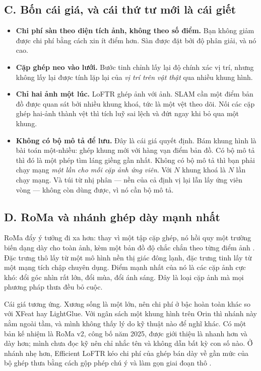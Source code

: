 \documentclass[../../deep_learning.tex]{subfiles}
\begin{document}
\subsection{C. Bốn cái giá, và cái thứ tư mới là cái giết}
\begin{itemize}
\item \textbf{Chi phí sàn theo diện tích ảnh, không theo số điểm.} Bạn không giảm được chi phí bằng cách xin ít điểm hơn. Sàn được đặt bởi độ phân giải, và nó cao.
\item \textbf{Cặp ghép neo vào lưới.} Bước tinh chỉnh lấy lại độ chính xác vị trí, nhưng không lấy lại được tính lặp lại của \emph{vị trí trên vật thật} qua nhiều khung hình.
\item \textbf{Chỉ hai ảnh một lúc.} LoFTR ghép ảnh với ảnh. SLAM cần một điểm bản đồ được quan sát bởi nhiều khung khoá, tức là một vệt theo dõi. Nối các cặp ghép hai-ảnh thành vệt thì tích luỹ sai lệch và đứt ngay khi bỏ qua một khung.
\item \textbf{Không có bộ mô tả để lưu.} Đây là cái giá quyết định. Bám khung hình là bài toán một-nhiều: ghép khung mới với hàng vạn điểm bản đồ. Có bộ mô tả thì đó là một phép tìm láng giềng gần nhất. Không có bộ mô tả thì bạn phải chạy mạng \emph{một lần cho mỗi cặp ảnh ứng viên}. Với \(N\) khung khoá là \(N\) lần chạy mạng. Và túi từ nhị phân \cite{galvez2012dbow2} --- nền của cả định vị lại lẫn lấy ứng viên vòng --- không còn dùng được, vì nó cần bộ mô tả.
\end{itemize}

\subsection{D. RoMa và nhánh ghép dày mạnh nhất}
RoMa đẩy ý tưởng đi xa hơn: thay vì một tập cặp ghép, nó hồi quy một trường biến dạng dày cho toàn ảnh, kèm một bản đồ độ chắc chắn theo từng điểm ảnh \cite{edstedt2024roma}. Đặc trưng thô lấy từ một mô hình nền thị giác đông lạnh, đặc trưng tinh lấy từ một mạng tích chập chuyên dụng. Điểm mạnh nhất của nó là các cặp ảnh cực khó: đổi góc nhìn rất lớn, đổi mùa, đổi ánh sáng. Đây là loại cặp ảnh mà mọi phương pháp thưa đều bỏ cuộc.

Cái giá tương ứng. Xương sống là một  lớn, nên chi phí ở bậc hoàn toàn khác so với XFeat hay LightGlue. Với ngân sách một khung hình trên Orin thì nhánh này nằm ngoài tầm, và mình không thấy lý do kỹ thuật nào để nghĩ khác. Có một bản kế nhiệm là RoMa v2, công bố năm 2025, được giới thiệu là nhanh hơn và dày hơn; mình chưa đọc kỹ nên chỉ nhắc tên và không dẫn bất kỳ con số nào. Ở nhánh nhẹ hơn, Efficient LoFTR kéo chi phí của ghép bán dày về gần mức của bộ ghép thưa bằng cách gộp phép chú ý và làm gọn giai đoạn thô \cite{wang2024efficientloftr}.
\end{document}
